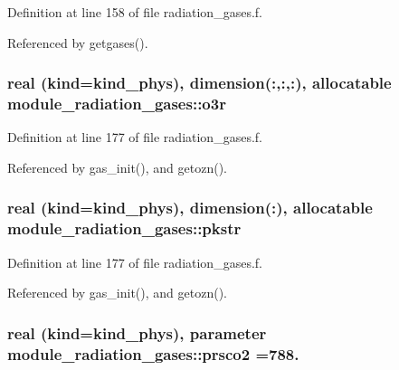 Definition at line 158 of file radiation\+\_\+gases.\+f.



Referenced by getgases().

\subsubsection[{\texorpdfstring{o3r}{o3r}}]{\setlength{\rightskip}{0pt plus 5cm}real (kind=kind\+\_\+phys), dimension(\+:,\+:,\+:), allocatable module\+\_\+radiation\+\_\+gases\+::o3r\hspace{0.3cm}{\ttfamily [private]}}\hypertarget{group__module__radiation__gases_gad18392d991a9ef4b6ff0e8e822176a18}{}\label{group__module__radiation__gases_gad18392d991a9ef4b6ff0e8e822176a18}


Definition at line 177 of file radiation\+\_\+gases.\+f.



Referenced by gas\+\_\+init(), and getozn().

\subsubsection[{\texorpdfstring{pkstr}{pkstr}}]{\setlength{\rightskip}{0pt plus 5cm}real (kind=kind\+\_\+phys), dimension(\+:), allocatable module\+\_\+radiation\+\_\+gases\+::pkstr\hspace{0.3cm}{\ttfamily [private]}}\hypertarget{group__module__radiation__gases_gac7466def3963591ebfc48298806b1f6a}{}\label{group__module__radiation__gases_gac7466def3963591ebfc48298806b1f6a}


Definition at line 177 of file radiation\+\_\+gases.\+f.



Referenced by gas\+\_\+init(), and getozn().

\subsubsection[{\texorpdfstring{prsco2}{prsco2}}]{\setlength{\rightskip}{0pt plus 5cm}real (kind=kind\+\_\+phys), parameter module\+\_\+radiation\+\_\+gases\+::prsco2 =788.\hspace{0.3cm}{\ttfamily [private]}}\hypertarget{group__module__radiation__gases_gab09dc05b8a02e9a0b56991508b599708}{}\label{group__module__radiation__gases_gab09dc05b8a02e9a0b56991508b599708}


